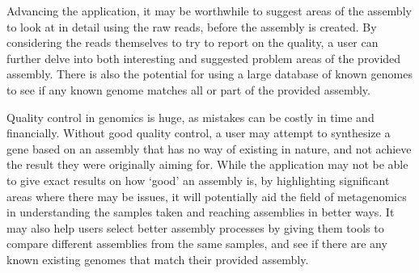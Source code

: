 \documentclass[11pt,fleqn,twoside]{article}
\begin{document}
Advancing the application, it may be worthwhile to suggest areas of the assembly to look at in detail using the raw reads, before the assembly is created. By considering the reads themselves to try to report on the quality, a user can further delve into both interesting and suggested problem areas of the provided assembly. There is also the potential for using a large database of known genomes to see if any known genome matches all or part of the provided assembly.

Quality control in genomics is huge, as mistakes can be costly in time and financially. Without good quality control, a user may attempt to synthesize a gene based on an assembly that has no way of existing in nature, and not achieve the result they were originally aiming for. While the application may not be able to give exact results on how `good' an assembly is, by highlighting significant areas where there may be issues, it will potentially aid the field of metagenomics in understanding the samples taken and reaching assemblies in better ways. It may also help users select better assembly processes by giving them tools to compare different assemblies from the same samples, and see if there are any known existing genomes that match their provided assembly.

\end{document}
